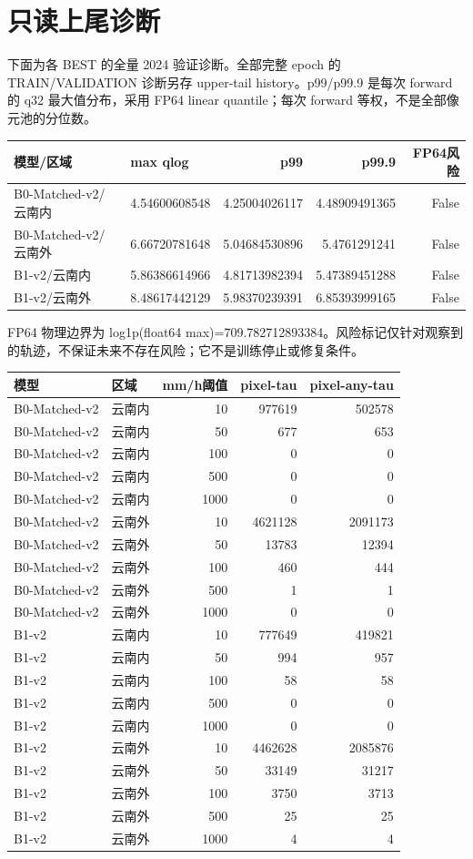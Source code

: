 \documentclass[UTF8,a4paper,11pt,fontset=windows]{ctexart}
\begin{document}
\section{只读上尾诊断}
下面为各 BEST 的全量 2024 验证诊断。全部完整 epoch 的 TRAIN/VALIDATION 诊断另存 upper-tail history。p99/p99.9 是每次 forward 的 q32 最大值分布，采用 FP64 linear quantile；每次 forward 等权，不是全部像元池的分位数。
\begin{longtable}{llrrr}\toprule 模型/区域 & max qlog & p99 & p99.9 & FP64风险\\\midrule\endhead
B0-Matched-v2/云南内 & 4.54600608548 & 4.25004026117 & 4.48909491365 & False\\
B0-Matched-v2/云南外 & 6.66720781648 & 5.04684530896 & 5.4761291241 & False\\
B1-v2/云南内 & 5.86386614966 & 4.81713982394 & 5.47389451288 & False\\
B1-v2/云南外 & 8.48617442129 & 5.98370239391 & 6.85393999165 & False\\
\bottomrule\end{longtable}
FP64 物理边界为 log1p(float64 max)=709.782712893384。风险标记仅针对观察到的轨迹，不保证未来不存在风险；它不是训练停止或修复条件。
\begin{longtable}{llrrr}\toprule 模型 & 区域 & mm/h阈值 & pixel-tau & pixel-any-tau\\\midrule\endhead
B0-Matched-v2 & 云南内 & 10 & 977619 & 502578\\
B0-Matched-v2 & 云南内 & 50 & 677 & 653\\
B0-Matched-v2 & 云南内 & 100 & 0 & 0\\
B0-Matched-v2 & 云南内 & 500 & 0 & 0\\
B0-Matched-v2 & 云南内 & 1000 & 0 & 0\\
B0-Matched-v2 & 云南外 & 10 & 4621128 & 2091173\\
B0-Matched-v2 & 云南外 & 50 & 13783 & 12394\\
B0-Matched-v2 & 云南外 & 100 & 460 & 444\\
B0-Matched-v2 & 云南外 & 500 & 1 & 1\\
B0-Matched-v2 & 云南外 & 1000 & 0 & 0\\
B1-v2 & 云南内 & 10 & 777649 & 419821\\
B1-v2 & 云南内 & 50 & 994 & 957\\
B1-v2 & 云南内 & 100 & 58 & 58\\
B1-v2 & 云南内 & 500 & 0 & 0\\
B1-v2 & 云南内 & 1000 & 0 & 0\\
B1-v2 & 云南外 & 10 & 4462628 & 2085876\\
B1-v2 & 云南外 & 50 & 33149 & 31217\\
B1-v2 & 云南外 & 100 & 3750 & 3713\\
B1-v2 & 云南外 & 500 & 25 & 25\\
B1-v2 & 云南外 & 1000 & 4 & 4\\
\bottomrule\end{longtable}
\end{document}
